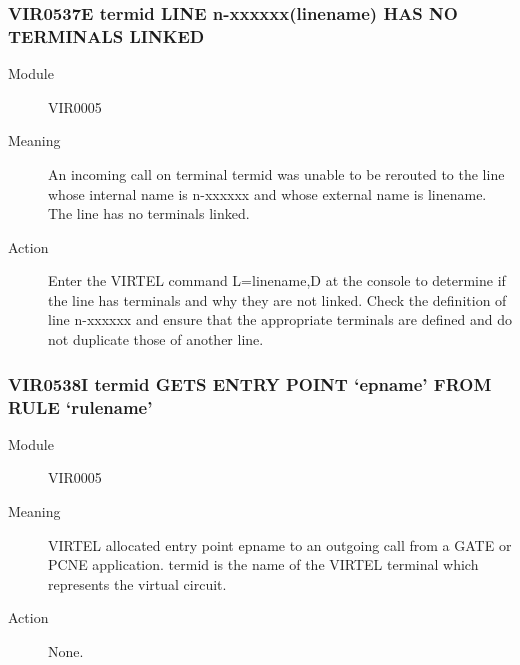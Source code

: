 \documentclass[letterpaper,10pt,english]{sphinxmanual}
\begin{document}
\subsubsection{VIR0537E termid LINE n-xxxxxx(linename) HAS NO TERMINALS LINKED}
\label{\detokenize{messages:vir0537e-termid-line-n-xxxxxx-linename-has-no-terminals-linked}}\begin{description}
\item[{Module}] \leavevmode
VIR0005

\item[{Meaning}] \leavevmode
An incoming call on terminal termid was unable to be rerouted to the line whose internal name is n-xxxxxx and whose external name is linename. The line has no terminals linked.

\item[{Action}] \leavevmode
Enter the VIRTEL command L=linename,D at the console to determine if the line has terminals and why they are   not linked. Check the definition of line n-xxxxxx and ensure that the appropriate terminals are defined and do not duplicate those of another line.

\end{description}


\subsubsection{VIR0538I termid GETS ENTRY POINT ‘epname’ FROM RULE ‘rulename’}
\label{\detokenize{messages:vir0538i-termid-gets-entry-point-epname-from-rule-rulename}}\begin{description}
\item[{Module}] \leavevmode
VIR0005

\item[{Meaning}] \leavevmode
VIRTEL allocated entry point epname to an outgoing call from a GATE or PCNE application. termid is the name of the VIRTEL terminal which represents the virtual circuit.

\item[{Action}] \leavevmode
None.

\end{description}
\end{document}
